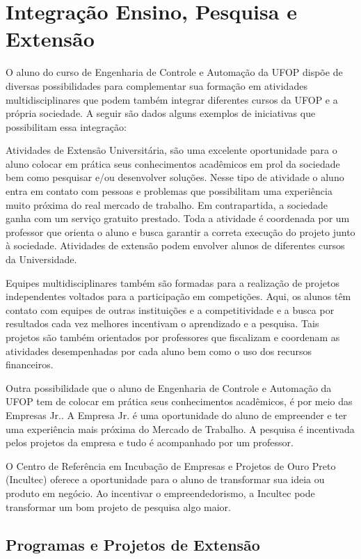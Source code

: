 \section{Integração Ensino, Pesquisa e Extensão}

O aluno do curso de Engenharia de Controle e Automação da UFOP dispõe de diversas possibilidades para complementar sua formação em atividades multidisciplinares que podem também integrar diferentes cursos da UFOP e a própria sociedade. A seguir são dados alguns exemplos de iniciativas que possibilitam essa integração:

Atividades de Extensão Universitária, são uma excelente oportunidade para o aluno colocar em prática seus conhecimentos acadêmicos em prol da sociedade bem como pesquisar e/ou desenvolver soluções. Nesse tipo de atividade o aluno entra em contato com pessoas e problemas que possibilitam uma experiência muito próxima do real mercado de trabalho. Em contrapartida, a sociedade ganha com um serviço gratuito prestado. Toda a atividade é coordenada por um professor que orienta o aluno e busca garantir a correta execução do projeto junto à sociedade. Atividades de extensão podem envolver alunos de diferentes cursos da Universidade.

Equipes multidisciplinares também são formadas para a realização de projetos independentes voltados para a participação em competições. Aqui, os alunos têm contato com equipes de outras instituições e a competitividade e a busca por resultados cada vez melhores incentivam o aprendizado e a pesquisa. Tais projetos são também orientados por professores que fiscalizam e coordenam as atividades desempenhadas por cada aluno bem como o uso dos recursos financeiros.

Outra possibilidade que o aluno de Engenharia de Controle e Automação da UFOP tem de colocar em prática seus conhecimentos acadêmicos, é por meio das Empresas Jr.. A Empresa Jr. é uma oportunidade do aluno de empreender e ter uma experiência mais próxima do Mercado de Trabalho. A pesquisa é incentivada pelos projetos da empresa e tudo é acompanhado por um professor.

O Centro de Referência em Incubação de Empresas e Projetos de Ouro Preto (Incultec) oferece a oportunidade para o aluno de transformar sua ideia ou produto em negócio. Ao incentivar o empreendedorismo, a Incultec pode transformar um bom projeto de pesquisa algo maior.

\subsection*{Programas e Projetos de Extensão}

